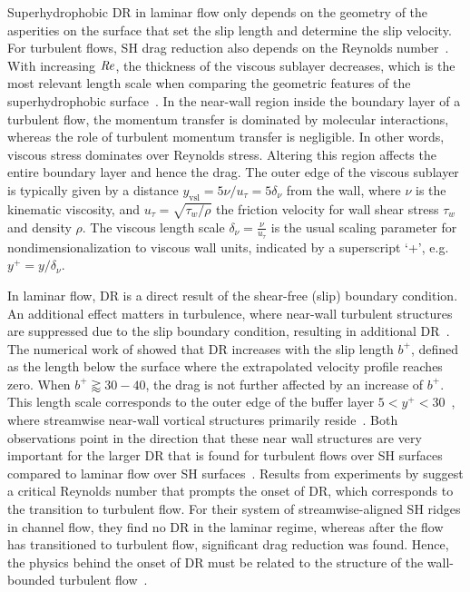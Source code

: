 Superhydrophobic DR in laminar flow only depends on the geometry of the asperities on the surface that set the slip length and determine the slip velocity. For turbulent flows, SH drag reduction also depends on the Reynolds number~\citep{Park2013}. With increasing $\mbox{\textit{Re}}$, the thickness of the viscous sublayer decreases, which is the most relevant length scale when comparing the geometric features of the superhydrophobic surface~\citep{Daniello2009}. In the near-wall region inside the boundary layer of a turbulent flow, the momentum transfer is dominated by molecular interactions, whereas the role of turbulent momentum transfer is negligible. In other words, viscous stress dominates over Reynolds stress. Altering this region affects the entire boundary layer and hence the drag. The outer edge of the viscous sublayer is typically given by a distance $y_\text{vsl} = 5 \nu / u_\tau = 5 \delta_\nu$ from the wall, where $\nu$ is the kinematic viscosity, and $u_\tau = \sqrt{\tau_w / \rho}$ the friction velocity for wall shear stress $\tau_w$ and density $\rho$. The viscous length scale $\delta_\nu = \frac{\nu}{u_\tau}$ is the usual scaling parameter for nondimensionalization to viscous wall units, indicated by a superscript `+', e.g. $y^+ = y/\delta_\nu$.

In laminar flow, DR is a direct result of the shear-free (slip) boundary condition. An additional effect matters in turbulence, where near-wall turbulent structures are suppressed due to the slip boundary condition, resulting in additional DR~\citep{Park2013}. The numerical work of \cite{Park2013} showed that DR increases with the slip length $b^+$, defined as the length below the surface where the extrapolated velocity profile reaches zero. When $b^+ \gtrapprox 30-40$, the drag is not further affected by an increase of $b^+$. This length scale corresponds to the outer edge of the buffer layer $5 < y^+ < 30$~\citep{Pope}, where streamwise near-wall vortical structures primarily reside~\citep{Park2013}. Both observations point in the direction that these near wall structures are very important for the larger DR that is found for turbulent flows over SH surfaces compared to laminar flow over SH surfaces~\citep{Park2013}.  Results from experiments by \cite{Daniello2009} suggest a critical Reynolds number that prompts the onset of DR, which corresponds to the transition to turbulent flow. For their system of streamwise-aligned SH ridges in channel flow, they find no DR in the laminar regime, whereas after the flow has transitioned to turbulent flow, significant drag reduction was found. Hence, the physics behind the onset of DR must be related to the structure of the wall-bounded turbulent flow~\citep{Daniello2009}.

